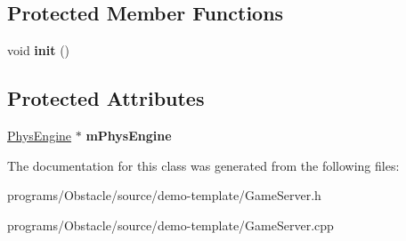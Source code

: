 \subsection*{Protected Member Functions}
\begin{DoxyCompactItemize}
\item 
void {\bfseries init} ()\hypertarget{classns__phys_1_1_game_server_ab583366056a19193b3bef168082e1486}{}\label{classns__phys_1_1_game_server_ab583366056a19193b3bef168082e1486}

\end{DoxyCompactItemize}
\subsection*{Protected Attributes}
\begin{DoxyCompactItemize}
\item 
\hyperlink{classns__phys_1_1_phys_engine}{Phys\+Engine} $\ast$ {\bfseries m\+Phys\+Engine}\hypertarget{classns__phys_1_1_game_server_aef501fd4c8db1bb19b3debad32e01a46}{}\label{classns__phys_1_1_game_server_aef501fd4c8db1bb19b3debad32e01a46}

\end{DoxyCompactItemize}


The documentation for this class was generated from the following files\+:\begin{DoxyCompactItemize}
\item 
programs/\+Obstacle/source/demo-\/template/Game\+Server.\+h\item 
programs/\+Obstacle/source/demo-\/template/Game\+Server.\+cpp\end{DoxyCompactItemize}
